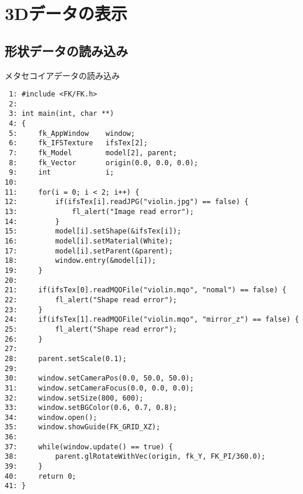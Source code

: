 \chapter{3Dデータの表示}
\section{形状データの読み込み} \label{sec:09-metaseq}
\begin{itembox}[l]{メタセコイアデータの読み込み}
\begin{small}
\begin{verbatim}
 1: #include <FK/FK.h>
 2: 
 3: int main(int, char **)
 4: {
 5:     fk_AppWindow    window;
 6:     fk_IFSTexture   ifsTex[2];
 7:     fk_Model        model[2], parent;
 8:     fk_Vector       origin(0.0, 0.0, 0.0);
 9:     int             i;
10: 
11:     for(i = 0; i < 2; i++) {
12:         if(ifsTex[i].readJPG("violin.jpg") == false) {
13:             fl_alert("Image read error");
14:         }
15:         model[i].setShape(&ifsTex[i]);
16:         model[i].setMaterial(White);
17:         model[i].setParent(&parent);
18:         window.entry(&model[i]);
19:     }
20: 
21:     if(ifsTex[0].readMQOFile("violin.mqo", "nomal") == false) {
22:         fl_alert("Shape read error");
23:     }
24:     if(ifsTex[1].readMQOFile("violin.mqo", "mirror_z") == false) {
25:         fl_alert("Shape read error");
26:     }
27: 
28:     parent.setScale(0.1);
29: 
30:     window.setCameraPos(0.0, 50.0, 50.0);
31:     window.setCameraFocus(0.0, 0.0, 0.0);
32:     window.setSize(800, 600);
33:     window.setBGColor(0.6, 0.7, 0.8);
34:     window.open();
35:     window.showGuide(FK_GRID_XZ);
36: 
37:     while(window.update() == true) {
38:         parent.glRotateWithVec(origin, fk_Y, FK_PI/360.0);
39:     }
40:     return 0;
41: }
\end{verbatim}
\end{small}
\end{itembox}
